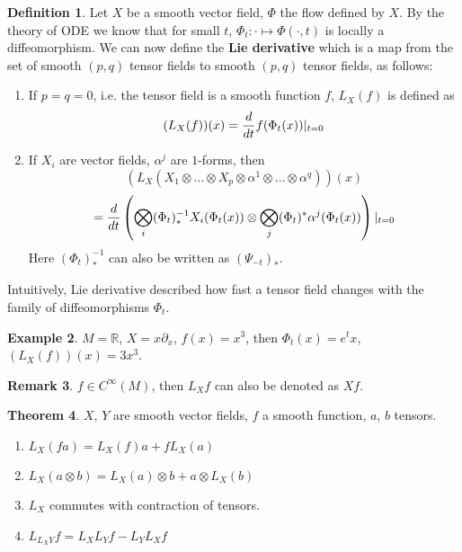 \documentclass{article}
\theoremstyle{definition}
\newtheorem{thm}{Theorem}[section]
\newtheorem{dfn}[thm]{Definition}
\newtheorem{rmk}[thm]{Remark}
\newtheorem{exm}[thm]{Example}
\begin{document}
\begin{dfn}\label{lieder}
    Let $X$ be a smooth vector field, $\Phi$ the flow defined by $X$. By the theory of ODE we know that for small $t$, $\Phi_t: \cdot\mapsto \Phi(\cdot, t)$ is locally a diffeomorphism. We can now define the {\bf Lie derivative} which is a map from the set of smooth $(p, q)$ tensor fields to smooth $(p, q)$ tensor fields, as follows:
    \begin{enumerate}
        \item If $p=q=0$, i.e. the tensor field is a smooth function $f$, $L_X(f)$ is defined as
        \[(L_X(f))(x)={d\over dt}f(\Phi_t(x))|_{t=0}\]
        \item If $X_i$ are vector fields, $\alpha^j$ are $1$-forms, then
        \[(L_X(X_1\otimes\dots\otimes X_p\otimes \alpha^1\otimes\dots\otimes \alpha^q))(x)\]
        \[={d\over dt}\left(\bigotimes_i(\Phi_t)^{-1}_*X_i(\Phi_t(x))\otimes \bigotimes_j(\Phi_t)^*\alpha^j(\Phi_t(x))\right)|_{t=0}\]
        Here $(\Phi_t)^{-1}_*$ can also be written as $(\Psi_{-t})_*$.
    \end{enumerate}
\end{dfn}

Intuitively, Lie derivative described how fast a tensor field changes with the family of diffeomorphisms $\Phi_t$.

\begin{exm}
   $M=\mathbb{R}$, $X=x\partial_x$, $f(x)=x^3$, then $\Phi_t(x)=e^tx$, $(L_X(f))(x)=3x^3$.    
\end{exm}

\begin{rmk}
  $f\in C^\infty(M)$, then $L_Xf$ can also be denoted as $Xf$.    
\end{rmk}

\begin{thm}\label{lieprop}
    $X$, $Y$ are smooth vector fields, $f$ a smooth function, $a$, $b$ tensors.
    \begin{enumerate}
        \item $L_X(fa)=L_X(f)a+fL_X(a)$
        \item $L_X(a\otimes b)=L_X(a)\otimes b+a\otimes L_X(b)$
        \item $L_X$ commutes with contraction of tensors.
        \item $L_{L_X Y}f=L_XL_Yf-L_YL_Xf$
    \end{enumerate}
\end{thm}
\end{document}
